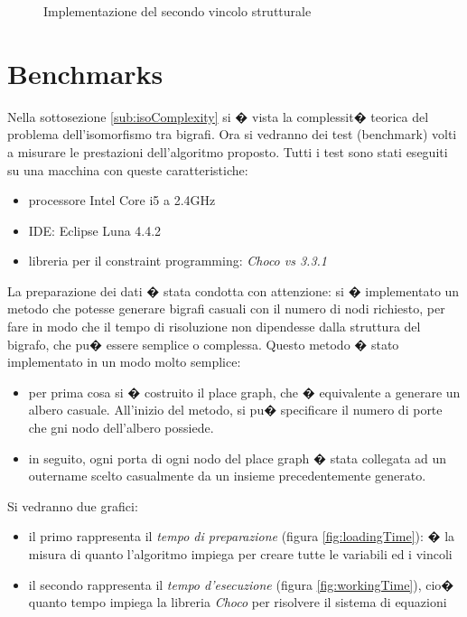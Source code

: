 \begin{itemize}
\begin{figure*}[th]
	\caption{Implementazione del secondo vincolo strutturale \label{fig:secConstraintChoco}}
	\end{figure*}
	
\end{itemize}


\section{Benchmarks}\label{ref:sec:benchmarks}
Nella sottosezione \ref{sub:isoComplexity} si � vista la complessit� teorica del problema dell'isomorfismo tra bigrafi. Ora si vedranno dei test (benchmark) volti a misurare le prestazioni dell'algoritmo proposto. Tutti i test sono stati eseguiti su una macchina con queste caratteristiche:
\begin{itemize}
	\item
	processore Intel Core i5 a 2.4GHz
	\item
	IDE: Eclipse Luna 4.4.2
	\item
	libreria per il constraint programming: \emph{Choco vs 3.3.1}
\end{itemize}

La preparazione dei dati � stata condotta con attenzione: si � implementato un metodo che potesse generare bigrafi casuali con il numero di nodi richiesto, per fare in modo che il tempo di risoluzione non dipendesse dalla struttura del bigrafo, che pu� essere semplice o complessa. Questo metodo � stato implementato in un modo molto semplice: \begin{itemize}
	\item
	per prima cosa si � costruito il place graph, che � equivalente a generare un albero casuale. All'inizio del metodo, si pu� specificare il numero di porte che gni nodo dell'albero possiede.
	\item
	in seguito, ogni porta di ogni nodo del place graph � stata collegata ad un outername scelto casualmente da un insieme precedentemente generato.
\end{itemize}

Si vedranno due grafici: 
\begin{itemize}
	\item
	il primo rappresenta il \emph{tempo di preparazione} (figura \ref{fig:loadingTime}): � la misura di quanto l'algoritmo impiega per creare tutte le variabili ed i vincoli
	\item
	il secondo rappresenta il \emph{tempo d'esecuzione} (figura \ref{fig:workingTime}), cio� quanto tempo impiega la libreria \emph{Choco} per risolvere il sistema di equazioni
\end{itemize}



